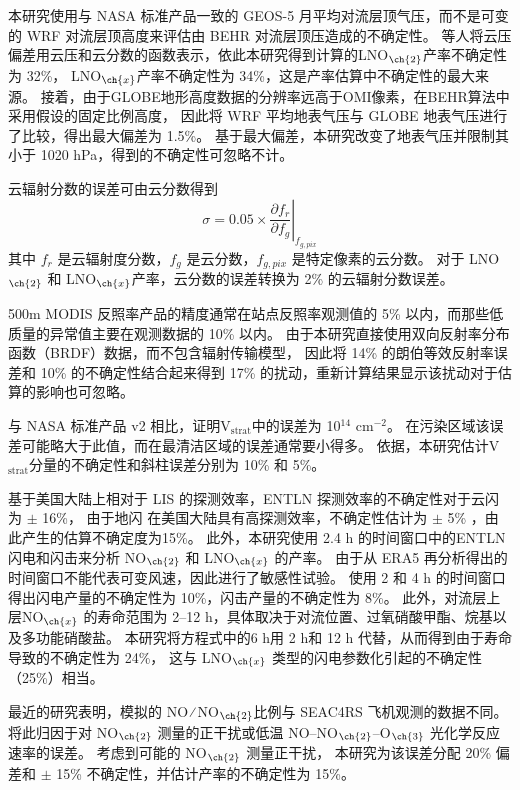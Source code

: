 本研究使用与 NASA 标准产品一致的 GEOS-5 月平均对流层顶气压，而不是可变的 WRF 对流层顶高度来评估由 BEHR 对流层顶压造成的不确定性。
\citet{Acarreta.2004}等人将云压偏差用云压和云分数的函数表示，依此本研究得到计算的LNO$_{\ch{2}}$产率不确定性为 32\%，
LNO$_{\ch{x}}$产率不确定性为 34\%，这是产率估算中不确定性的最大来源。
接着，由于GLOBE地形高度数据的分辨率远高于OMI像素，在BEHR算法中采用假设的固定比例高度，
因此\citet{Laughner.2019a}将 WRF 平均地表气压与 GLOBE 地表气压进行了比较，得出最大偏差为 1.5\%。
基于最大偏差，本研究改变了地表气压并限制其小于 1020 hPa，得到的不确定性可忽略不计。

云辐射分数的误差可由云分数得到
\begin{equation}
\sigma = 0.05 \times \left.\frac{\partial{f_r}}{\partial{f_g}}\right|_{f_{g,pix}}
\end{equation}
其中 $f_r$ 是云辐射度分数，$f_g$ 是云分数，$f_{g,pix}$ 是特定像素的云分数。
对于 LNO$_{\ch{2}}$ 和 LNO$_{\ch{x}}$产率，云分数的误差转换为 2\% 的云辐射分数误差。

500m MODIS 反照率产品的精度通常在站点反照率观测值的 5\% 以内，而那些低质量的异常值主要在观测数据的 10\% 以内\citep{Schaaf.2011}。
由于本研究直接使用双向反射率分布函数（BRDF）数据，而不包含辐射传输模型，
因此将 14\% 的朗伯等效反射率误差和 10\% 的不确定性结合起来得到 17\% 的扰动\citep{Laughner.2019a}，重新计算结果显示该扰动对于估算的影响也可忽略。

与 NASA 标准产品 v2 相比，\citet{Krotkov.2017}证明V$_\textrm{strat}$中的误差为 10$^{14}$ cm$^{-2}$。
在污染区域该误差可能略大于此值，而在最清洁区域的误差通常要小得多\citep{Bucsela.2013}。
依据\citet{Allen.2019}，本研究估计V$_\textrm{strat}$分量的不确定性和斜柱误差分别为 10\% 和 5\%。

基于美国大陆上相对于 LIS 的探测效率，ENTLN 探测效率的不确定性对于云闪为 $\pm$ 16\%，
由于地闪 在美国大陆具有高探测效率，不确定性估计为 $\pm$ 5\% \citep{Lapierre.2020}，由此产生的估算不确定度为15\%。
此外，本研究使用 2.4 h 的时间窗口中的ENTLN闪电和闪击来分析 NO$_{\ch{2}}$ 和 LNO$_{\ch{x}}$ 的产率。
由于从 ERA5 再分析得出的时间窗口不能代表可变风速，因此进行了敏感性试验。
使用 2 和 4 h 的时间窗口得出闪电产量的不确定性为 10\%，闪击产量的不确定性为 8\%。
此外，对流层上层NO$_{\ch{x}}$ 的寿命范围为 2--12 h，具体取决于对流位置、过氧硝酸甲酯、烷基以及多功能硝酸盐\citep{Nault.2017}。
本研究将方程式中的6 h用 2 h和 12 h 代替，从而得到由于寿命导致的不确定性为 24\%，
这与 LNO$_{\ch{x}}$ 类型的闪电参数化引起的不确定性（25\%）相当。

最近的研究表明，模拟的 NO ∕ NO$_{\ch{2}}$比例与 SEAC4RS 飞机观测的数据不同\citep{Travis.2016,Silvern.2018}。
\citet{Silvern.2018}将此归因于对 NO$_{\ch{2}}$ 测量的正干扰或低温 NO--NO$_{\ch{2}}$--O$_{\ch{3}}$ 光化学反应速率的误差。
考虑到可能的 NO$_{\ch{2}}$ 测量正干扰\citep{Allen.2019,Bucsela.2019}，
本研究为该误差分配 20\% 偏差和 $\pm$ 15\% 不确定性，并估计产率的不确定性为 15\%。

